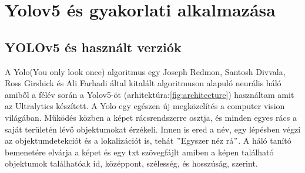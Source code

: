 \documentclass[12pt,oneside,a4paper]{article}
\theoremstyle{remark}
\begin{document}
\section{Yolov5 és gyakorlati alkalmazása}\label{sec:yolov5-es-gyakorlati-alkalmazasa}

\subsection{YOLOv5 és használt verziók}\label{subsec:yolov5-es-hasznalt-verziok}

A Yolo(You only look once) algoritmus egy Joseph Redmon, Santosh Divvala, Ross Girshick és Ali Farhadi által kitalált
algoritmuson alapuló neurális háló amiből a félév során a Yolov5-öt (arhitektúra:\ref{fig:architecture}) használtam
amit az Ultralytics készített.
A Yolo egy egészen új megközelítés a computer vision világában.
Működés közben a képet rácsrendszerre osztja, és minden egyes rács a saját területén lévő objektumokat érzékeli.
Innen is ered a név, egy lépésben végzi az objektumdetekciót és a lokalizációt is, tehát \("\)Egyszer néz rá\("\).
 A háló tanító bemenetére elvárja a képet és egy txt szövegfájlt amiben a képen található objektumok találhatóak id,
középpont, szélesség, és hosszúság, szerint.
\end{document}
